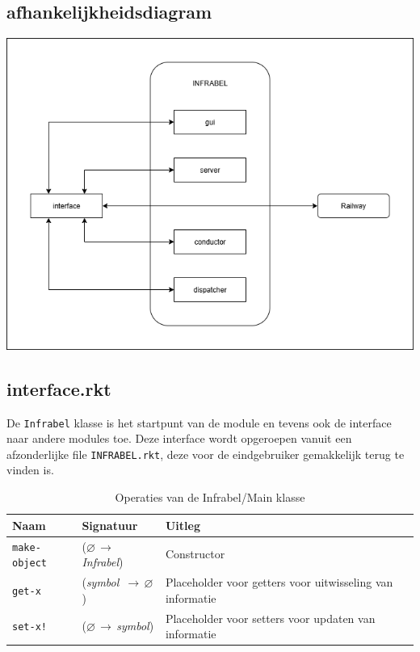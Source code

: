 \documentclass[a4paper, 11pt]{article}
\newcommand{\naar}{\,$\rightarrow$\,}
\renewcommand{\empty}{$\varnothing$}
\newcommand{\<}{\scriptsize\textless\normalsize}
\renewcommand{\>}{\scriptsize\textgreater\normalsize}
\begin{document}
\subsection{afhankelijkheidsdiagram} %
\begin{center}
	\includegraphics[scale=.5]{Afhankelijkheidsdiagrammen/infrabel.png}
\end{center}

\subsection{interface.rkt} %
De \texttt{Infrabel} klasse is het startpunt van de module en tevens ook de interface naar andere modules toe. Deze interface wordt opgeroepen vanuit een afzonderlijke file \texttt{INFRABEL.rkt}, deze voor de eindgebruiker gemakkelijk terug te vinden is.
\begin{table}[H]
	\begin{center}
		{
		\begin{tabular}{|l l l|}
			\hline
			\textbf{Naam} & \textbf{Signatuur} & \textbf{Uitleg}\\
			\hline
			\texttt{make-object} & (\empty \naar \textit{Infrabel}) & Constructor\\
			\hline
			\texttt{get-x} & (\textit{symbol} \naar \empty) & Placeholder voor getters voor uitwisseling van informatie\\
			\texttt{set-x!} & (\empty \naar \textit{symbol}) & Placeholder voor setters voor updaten van informatie\\
			\hline
		\end{tabular}}
		\caption{Operaties van de Infrabel/Main klasse}
	\end{center}
\end{table}
\end{document}

